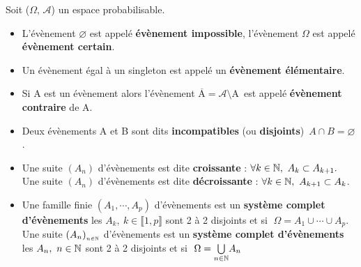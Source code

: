 \noindent Soit (\(\Omega,\,\mathcal{A}\)) un espace probabilisable.
\begin{itemize}[label=•]
    \item L'évènement \(\varnothing\) est appelé \textbf{évènement impossible}, l'évènement \(\Omega\) est appelé \textbf{évènement certain}.
    
    \item Un évènement égal à un singleton est appelé un \textbf{évènement élémentaire}.
    
    \item Si A est un évènement alors l'évènement $\overline{\text{A}}=\mathcal{A}\!\setminus\! \text{A}\,$ est appelé \textbf{évènement contraire} de A.
    
    \item Deux évènements A et B sont dits \textbf{incompatibles} (ou \textbf{disjoints}) \ssi \(\,A\cap B=\varnothing\).
    
    \item Une suite \((A_n)\) d'évènements est dite \textbf{croissante} \ssi : \(\forall k\in \mathbb{N},\ A_k\subset A_{k+1}.\)\vspace{0.1cm} \\
    Une suite \((A_n)\) d'évènements est dite \textbf{décroissante} \ssi : \(\forall k\in \mathbb{N},\ A_{k+1} \subset A_k\).

    \item Une famille finie \((A_1,\cdots,A_p)\) d'évènements est un \textbf{système complet d'évènements} \ssi les \(A_k,\ k\in \llbracket 1,p \rrbracket\) sont 2 à 2 disjoints et si \(\;\Omega=A_1\cup\cdots\cup A_p.\)\vspace{0.1cm}\\
    Une suite \((A_n)_{_{n\in \mathbb{N}}}\) d'évènements est un \textbf{système complet d'évènements} \ssi les \(A_n,\ n\in \mathbb{N}\) sont 2 à 2 disjoints et si \(\;\Omega=\underset{n\in \mathbb{N}}{\bigcup}A_n\)
    
\end{itemize}


\vspace{1.5cm}

